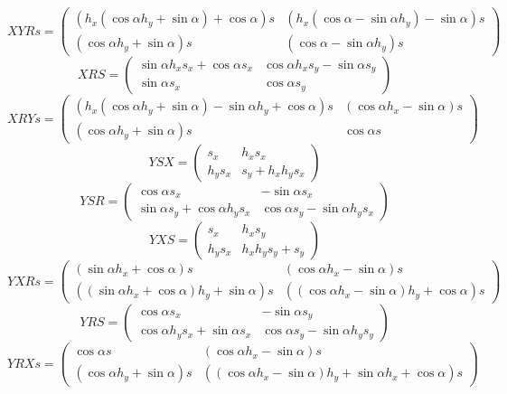 \[XYRs = \begin{pmatrix}\left( {h_x} \left( \cos\alpha {h_y}+\sin\alpha\right) +\cos\alpha\right)  s & \left( {h_x} \left( \cos\alpha-\sin\alpha {h_y}\right) -\sin\alpha\right)  s\\
\left( \cos\alpha {h_y}+\sin\alpha\right)  s & \left( \cos\alpha-\sin\alpha {h_y}\right)  s\end{pmatrix}\]
\[XRS = \begin{pmatrix}\sin\alpha {h_x} {s_x}+\cos\alpha {s_x} & \cos\alpha {h_x} {s_y}-\sin\alpha {s_y}\\
\sin\alpha {s_x} & \cos\alpha {s_y}\end{pmatrix}\]
\[XRYs = \begin{pmatrix}\left( {h_x} \left( \cos\alpha {h_y}+\sin\alpha\right) -\sin\alpha {h_y}+\cos\alpha\right)  s & \left( \cos\alpha {h_x}-\sin\alpha\right)  s\\
\left( \cos\alpha {h_y}+\sin\alpha\right)  s & \cos\alpha s\end{pmatrix}\]
\[YSX = \begin{pmatrix}{s_x} & {h_x} {s_x}\\
{h_y} {s_x} & {s_y}+{h_x} {h_y} {s_x}\end{pmatrix}\]
\[YSR = \begin{pmatrix}\cos\alpha {s_x} & -\sin\alpha {s_x}\\
\sin\alpha {s_y}+\cos\alpha {h_y} {s_x} & \cos\alpha {s_y}-\sin\alpha {h_y} {s_x}\end{pmatrix}\]
\[YXS = \begin{pmatrix}{s_x} & {h_x} {s_y}\\
{h_y} {s_x} & {h_x} {h_y} {s_y}+{s_y}\end{pmatrix}\]
\[YXRs = \begin{pmatrix}\left( \sin\alpha {h_x}+\cos\alpha\right)  s & \left( \cos\alpha {h_x}-\sin\alpha\right)  s\\
\left( \left( \sin\alpha {h_x}+\cos\alpha\right)  {h_y}+\sin\alpha\right)  s & \left( \left( \cos\alpha {h_x}-\sin\alpha\right)  {h_y}+\cos\alpha\right)  s\end{pmatrix}\]
\[YRS = \begin{pmatrix}\cos\alpha {s_x} & -\sin\alpha {s_y}\\
\cos\alpha {h_y} {s_x}+\sin\alpha {s_x} & \cos\alpha {s_y}-\sin\alpha {h_y} {s_y}\end{pmatrix}\]
\[YRXs = \begin{pmatrix}\cos\alpha s & \left( \cos\alpha {h_x}-\sin\alpha\right)  s\\
\left( \cos\alpha {h_y}+\sin\alpha\right)  s & \left( \left( \cos\alpha {h_x}-\sin\alpha\right)  {h_y}+\sin\alpha {h_x}+\cos\alpha\right)  s\end{pmatrix}\]
